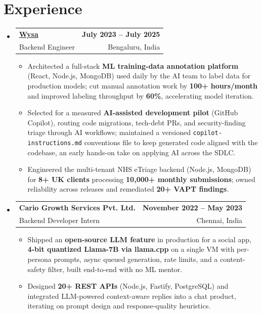 \documentclass[letterpaper,10pt]{article}
\makeatletter
\newcommand{\resumeItem}[1]{
    \item\small{#1\vspace{-1pt}}
  }
\newcommand{\resumeSubheading}[4]{
    \vspace{1pt}\item
      \begin{tabular*}{0.985\textwidth}[t]{l@{\extracolsep{\fill}}r}
        \textbf{#1} & \textbf{\small #2} \\
        {\small\color{ResumeSlate} #3} & {\small\color{ResumeSlate} #4} \\
      \end{tabular*}\vspace{-6pt}
  }
\newcommand{\resumeSubHeadingListStart}{\begin{itemize}[leftmargin=0.0in, label={}, itemsep=2pt, topsep=2pt]}
\newcommand{\resumeSubHeadingListEnd}{\end{itemize}}
\newcommand{\resumeItemListStart}{\begin{itemize}[leftmargin=0.18in, itemsep=2pt, topsep=1pt]}
\newcommand{\resumeItemListEnd}{\end{itemize}\vspace{-4pt}}
\makeatother
\begin{document}
  \section{Experience}
  \resumeSubHeadingListStart
    \resumeSubheading
      {\href{https://www.wysa.io}{Wysa}}{July 2023 -- July 2025}
      {Backend Engineer}{Bengaluru, India}
      \resumeItemListStart
        \resumeItem{Architected a full-stack \textbf{ML training-data annotation platform} (React, Node.js, MongoDB) used daily by the AI team to label data for production models; cut manual annotation work by \textbf{100+ hours/month} and improved labeling throughput by \textbf{60\%}, accelerating model iteration.}
        \resumeItem{Selected for a measured \textbf{AI-assisted development pilot} (GitHub Copilot), routing code migrations, tech-debt PRs, and security-finding triage through AI workflows; maintained a versioned \texttt{copilot-instructions.md} conventions file to keep generated code aligned with the codebase, an early hands-on take on applying AI across the SDLC.}
        \resumeItem{Engineered the multi-tenant NHS eTriage backend (Node.js, MongoDB) for \textbf{8+ UK clients} processing \textbf{10{,}000+ monthly submissions}; owned reliability across releases and remediated \textbf{20+ VAPT findings}.}
      \resumeItemListEnd
    \resumeSubheading
      {Cario Growth Services Pvt. Ltd.}{November 2022 -- May 2023}
      {Backend Developer Intern}{Chennai, India}
      \resumeItemListStart
        \resumeItem{Shipped an \textbf{open-source LLM feature} in production for a social app, \textbf{4-bit quantized Llama-7B via llama.cpp} on a single VM with per-persona prompts, async queued generation, rate limits, and a content-safety filter, built end-to-end with no ML mentor.}
        \resumeItem{Designed \textbf{20+ REST APIs} (Node.js, Fastify, PostgreSQL) and integrated LLM-powered context-aware replies into a chat product, iterating on prompt design and response-quality heuristics.}
      \resumeItemListEnd
  \resumeSubHeadingListEnd
  \vspace{-4pt}
\end{document}
